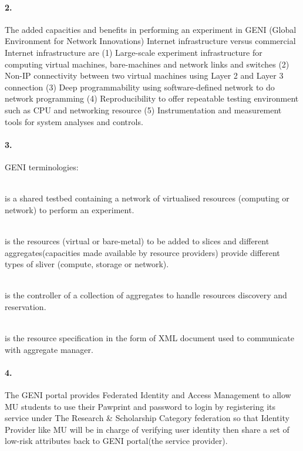 \documentclass[a4paper]{article}
\begin{document}
\paragraph{2. } The added capacities and benefits in performing an experiment in GENI (Global Environment for Network Innovations) Internet infrastructure versus commercial Internet infrastructure are (1) Large-scale experiment infrastructure for computing virtual machines, bare-machines and network links and switches (2) Non-IP connectivity between two virtual machines using Layer 2 and Layer 3 connection (3) Deep programmability using software-defined network to do network programming (4) Reproducibility to offer repeatable testing environment such as CPU and networking resource (5) Instrumentation and measurement tools for system analyses and controls.

\paragraph{3. } GENI terminologies:
\begin{description}
\leftskip 0.4in
\parindent -0.4in
	\item[Slice: ] \hfill \\is a shared testbed containing a network of virtualised resources (computing or network) to perform an experiment.
	\item[Sliver: ] \hfill \\is the resources (virtual or bare-metal) to be added to slices and different aggregates(capacities made available by resource providers) provide different types of sliver (compute, storage or network).
	\item[Aggregate manager: ] \hfill \\is the controller of a collection of aggregates to handle resources discovery and reservation.
	\item[Rspec: ] \hfill \\is the resource specification in the form of XML document used to communicate with aggregate manager.
\end{description}

\paragraph{4. } The GENI portal provides Federated Identity and Access Management to allow MU students to use their Pawprint and password to login by registering its service under The Research \& Scholarship Category federation so that Identity Provider like MU will be in charge of verifying user identity then share a set of low-risk attributes back to GENI portal(the service provider).\\
\end{document}
